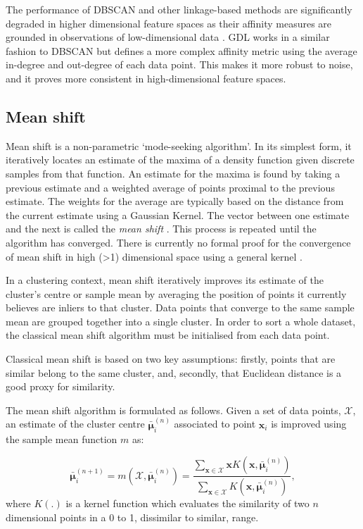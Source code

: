 \documentclass[../thesis.tex]{subfiles}
\begin{document}
The performance of DBSCAN and other linkage-based methods are significantly degraded in higher dimensional feature spaces as their affinity measures are grounded in observations of low-dimensional data \cite{ertoz2003finding}.
GDL \cite{Zhang2012} works in a similar fashion to DBSCAN but defines a more complex affinity metric using the average in-degree and out-degree of each data point. 
This makes it more robust to noise, and it proves more consistent in high-dimensional feature spaces. 


\subsection{Mean shift}\label{sec__litreview__meanshift}
Mean shift is a non-parametric `mode-seeking algorithm'. In its simplest form, it iteratively locates an estimate of the maxima of a density function given discrete samples from that function. 
An estimate for the maxima is found by taking a previous estimate and a weighted average of points proximal to the previous estimate. The weights for the average are typically based on the distance from the current estimate using a Gaussian Kernel. The vector between one estimate and the next is called the \textit{mean shift} \cite{Fukunaga1975}. This process is repeated until the algorithm has converged. There is currently no formal proof for the convergence of mean shift in high (>1) dimensional space using a general kernel \cite{ghassabeh2015sufficient}.

In a clustering context, mean shift iteratively improves its estimate of the cluster's centre or sample mean by averaging the position of points it currently believes are inliers to that cluster. Data points that converge to the same sample mean are grouped together into a single cluster.
In order to sort a whole dataset, the classical mean shift algorithm must be initialised from each data point.

Classical mean shift is based on two key assumptions: firstly, points that are similar belong to the same cluster, and, secondly, that Euclidean distance is a good proxy for similarity.

The mean shift algorithm is formulated as follows.
Given a set of data points, $\mathcal X$, an estimate of the cluster centre $\bar{\boldsymbol{\mu}}^{(n)}_i$ associated to point $\mathbf{x}_i$ is improved using the sample mean function $m$ as:

\begin{equation}\label{eq__DMS__mean_shift}
    \bar {\boldsymbol{\mu}}^{(n+1)}_i = m(\mathcal{X}, \bar {\boldsymbol{\mu}}^{(n)}_i) = \frac{\sum_{\mathbf x \in \mathcal X} \mathbf x K(\mathbf x, \bar {\boldsymbol{\mu}}^{(n)}_i) }{\sum_{\mathbf x \in \mathcal X} K(\mathbf x, \bar{\boldsymbol{\mu}}^{(n)}_i)},
\end{equation}
where $K(.)$ is a kernel function which evaluates the similarity of two $n$ dimensional points in a 0 to 1, dissimilar to similar, range.
\end{document}
